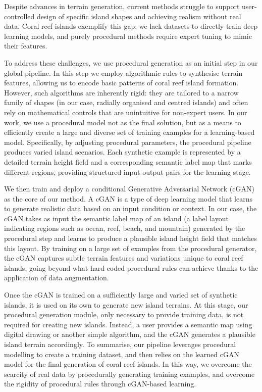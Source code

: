 Despite advances in terrain generation, current methods struggle to support user-controlled design of specific island shapes and achieving realism without real data. Coral reef islands exemplify this gap: we lack datasets to directly train deep learning models, and purely procedural methods require expert tuning to mimic their features.

To address these challenges, we use procedural generation as an initial step in our global pipeline. In this step we employ algorithmic rules to synthesise terrain features, allowing us to encode basic patterns of coral reef island formation. However, such algorithms are inherently rigid: they are tailored to a narrow family of shapes (in our case, radially organised and centred islands) and often rely on mathematical controls that are unintuitive for non-expert users. In our work, we use a procedural model not as the final solution, but as a means to efficiently create a large and diverse set of training examples for a learning-based model. Specifically, by adjusting procedural parameters, the procedural pipeline produces varied island scenarios. Each synthetic example is represented by a detailed terrain height field and a corresponding semantic label map that marks different regions, providing structured input-output pairs for the learning stage.

We then train and deploy a conditional Generative Adversarial Network (cGAN) as the core of our method. A cGAN is a type of deep learning model that learns to generate realistic data based on an input condition or context. In our case, the cGAN takes as input the semantic label map of an island (a label layout indicating regions such as ocean, reef, beach, and mountain) generated by the procedural step and learns to produce a plausible island height field that matches this layout. By training on a large set of examples from the procedural generator, the cGAN captures subtle terrain features and variations unique to coral reef islands, going beyond what hard-coded procedural rules can achieve thanks to the application of data augmentation.

Once the cGAN is trained on a sufficiently large and varied set of synthetic islands, it is used on its own to generate new island terrains. At this stage, our procedural generation module, only necessary to provide training data, is not required for creating new islands. Instead, a user provides a semantic map using digital drawing or another simple algorithm, and the cGAN generates a plausible island terrain accordingly. To summarise, our pipeline leverages procedural modelling to create a training dataset, and then relies on the learned cGAN model for the final generation of coral reef islands. In this way, we overcome the scarcity of real data by procedurally generating training examples, and overcome the rigidity of procedural rules through cGAN-based learning.


